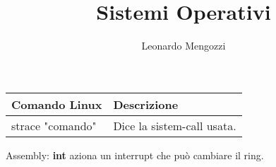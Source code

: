 \documentclass{article}
\title{Sistemi Operativi}
\author{Leonardo Mengozzi}
\date{}
\begin{document}
	\maketitle
	\begin{tabularx}{\textwidth}{lX}
	\hline
	Comando Linux & Descrizione\\
	\hline
	strace "comando" & Dice la sistem-call usata.\\

	\hline
	\end{tabularx}

	Assembly: \textbf{int} aziona un interrupt che può cambiare il ring.
\end{document}
